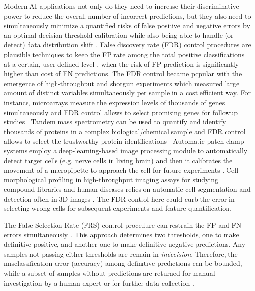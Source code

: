 \documentclass{article}
\begin{document}
Modern AI applications not only do they need to increase their discriminative power to reduce the overall number of incorrect predictions, but they also need to simultaneously minimize a quantified risks of false positive and negative errors by an optimal decision threshold calibration while also being able to handle (or detect) data distribution shift \cite{feng2022clinical, al2023artificial}. False discovery rate (FDR) control procedures are plausible techniques to keep the FP rate among the total positive classifications at a certain, user-defined level \cite{Benjamini1995Controlling}, when the risk of FP prediction is significantly higher than cost of FN predictions. The FDR control became popular with the emergence of high-throughput and shotgun experiments which measured large amount of distinct variables simultaneously per sample in a cost efficient way. For instance, microarrays measure the expression levels of thousands of genes simultaneously and FDR control allows to select promising genes for followup studies \cite{storey2002direct,storey2003statistical}. Tandem mass spectrometry can be used to quantify and identify thousands of proteins in a complex biological/chemical sample and FDR control allows to select the trustworthy protein identifications \cite{elias2007target}. Automatic patch clamp systems employ a deep-learning-based image processing module to automatically detect target cells (e.g. nerve cells in living brain) and then it calibrates the movement of a micropipette to approach the cell for future experiments \cite{koos2021automatic}. Cell morphological profiling in high-throughput imaging assays for studying compound libraries and human diseases \cite{moshkov2024learning} relies on automatic cell segmentation and detection often in 3D images \cite{falk2019u}. The FDR control here could curb the error in selecting wrong cells for subsequent experiments and feature quantification. 

The False Selection Rate (FRS) control procedure can restrain the FP and FN errors simultaneously \cite{zhao2023controlling}. This approach determines two thresholds, one to make definitive positive, and another one to make definitive negative predictions. Any samples not passing either thresholds are remain in {\em indecision}. Therefore, the misclassification error (accuracy) among definitive predictions can be bounded, while a subset of samples without predictions are returned for manual investigation by a human expert or for further data collection \cite{rava2021burden}. 
\end{document}
